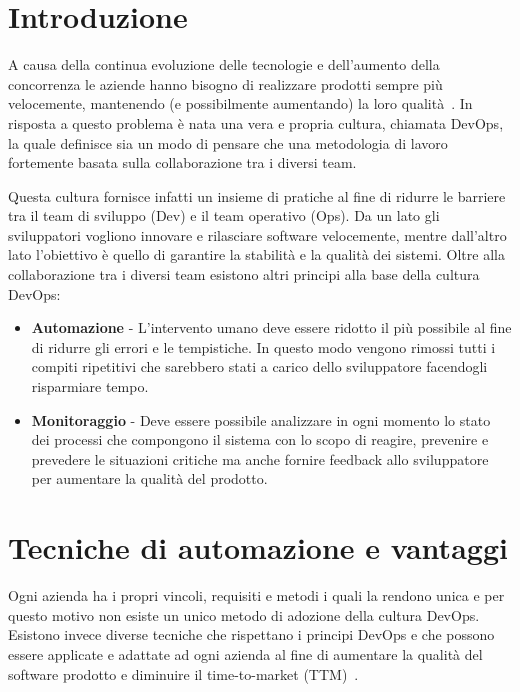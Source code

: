
\section{Introduzione}
A causa della continua evoluzione delle tecnologie e dell'aumento della concorrenza le aziende hanno bisogno di realizzare prodotti sempre più velocemente, mantenendo (e possibilmente aumentando) la loro qualità~\cite{krief2019learning}. In risposta a questo problema è nata una vera e propria cultura, chiamata DevOps, la quale definisce sia un modo di pensare che una metodologia di lavoro fortemente basata sulla collaborazione tra i diversi team.

Questa cultura fornisce infatti un insieme di pratiche al fine di ridurre le barriere tra il team di sviluppo (Dev) e il team operativo (Ops). Da un lato gli sviluppatori vogliono innovare e rilasciare software velocemente, mentre dall'altro lato l'obiettivo è quello di garantire la stabilità e la qualità dei sistemi. Oltre alla collaborazione tra i diversi team esistono altri principi alla base della cultura DevOps:
\begin{itemize}
    \item \textbf{Automazione} - L'intervento umano deve essere ridotto il più possibile al fine di ridurre gli errori e le tempistiche. In questo modo vengono rimossi tutti i compiti ripetitivi che sarebbero stati a carico dello sviluppatore facendogli risparmiare tempo.
    \item \textbf{Monitoraggio} - Deve essere possibile analizzare in ogni momento lo stato dei processi che compongono il sistema con lo scopo di reagire, prevenire e prevedere le situazioni critiche ma anche fornire feedback allo sviluppatore per aumentare la qualità del prodotto.
\end{itemize}

\section{Tecniche di automazione e vantaggi}
Ogni azienda ha i propri vincoli, requisiti e metodi i quali la rendono unica e per questo motivo non esiste un unico metodo di adozione della cultura DevOps. Esistono invece diverse tecniche che rispettano i principi DevOps e che possono essere applicate e adattate ad ogni azienda al fine di aumentare la qualità del software prodotto e diminuire il time-to-market (TTM)~\cite{devis2016effective}.

